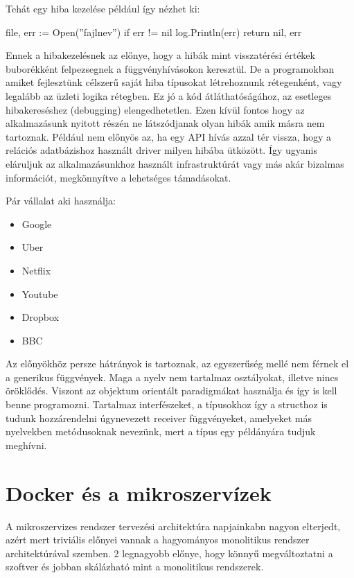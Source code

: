 Tehát egy hiba kezelése például így nézhet ki:
\begin{python}
    file, err := Open(''fajlnev'')
    if err != nil {
        log.Println(err)
        return nil, err
    }
\end{python}

Ennek a hibakezelésnek az előnye, hogy a hibák mint visszatérési értékek buborékként felpezsegnek a függvényhívásokon keresztül.
De a programokban amiket fejlesztünk célszerű saját hiba típusokat létrehoznunk rétegenként, vagy legalább az üzleti logika rétegben. Ez jó a kód átláthatóságához,
az esetleges hibakereséshez (debugging) elengedhetetlen. Ezen kívül fontos hogy az alkalmazásunk nyitott részén ne látszódjanak olyan hibák amik másra nem tartoznak. Például nem előnyös az, ha egy API hívás azzal tér vissza, hogy
a relációs adatbázishoz használt driver milyen hibába ütközött. Így ugyanis eláruljuk az alkalmazásunkhoz használt infrastruktúrát vagy más akár bizalmas információt, megkönnyítve a lehetséges támadásokat.

Pár vállalat aki használja:
\begin{itemize}
    \item Google
    \item Uber
    \item Netflix
    \item Youtube
    \item Dropbox
    \item BBC
\end{itemize}

Az előnyökhöz persze hátrányok is tartoznak, az egyszerűség mellé nem férnek el a generikus függvények.
Maga a nyelv nem tartalmaz osztályokat, illetve nincs öröklődés.
Viszont az objektum orientált paradigmákat használja és így is kell benne programozni.
Tartalmaz interfészeket, a típusokhoz így a structhoz is tudunk hozzárendelni úgynevezett receiver függvényeket, amelyeket más nyelvekben metódusoknak nevezünk, mert a típus egy példányára tudjuk meghívni.

\section{Docker és a mikroszervízek}

A mikroszervizes rendszer tervezési architektúra napjainkabn nagyon elterjedt, azért mert triviális előnyei vannak a hagyományos monolitikus rendszer architektúrával szemben.
2 legnagyobb előnye, hogy könnyű megváltoztatni a szoftver és jobban skálázható mint a monolitikus rendszerek.\\
